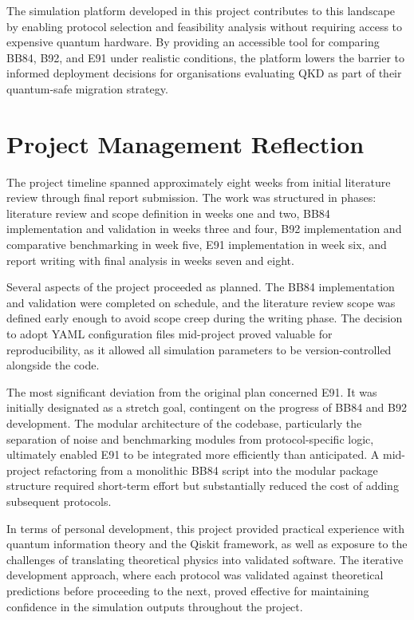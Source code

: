 \documentclass[10pt, a4paper]{report}
\begin{document}
The simulation platform developed in this project contributes to this landscape by enabling protocol selection and feasibility analysis without requiring access to expensive quantum hardware. By providing an accessible tool for comparing BB84, B92, and E91 under realistic conditions, the platform lowers the barrier to informed deployment decisions for organisations evaluating QKD as part of their quantum-safe migration strategy.



\section{Project Management Reflection}

The project timeline spanned approximately eight weeks from initial literature review through final report submission. The work was structured in phases: literature review and scope definition in weeks one and two, BB84 implementation and validation in weeks three and four, B92 implementation and comparative benchmarking in week five, E91 implementation in week six, and report writing with final analysis in weeks seven and eight.

Several aspects of the project proceeded as planned. The BB84 implementation and validation were completed on schedule, and the literature review scope was defined early enough to avoid scope creep during the writing phase. The decision to adopt YAML configuration files mid-project proved valuable for reproducibility, as it allowed all simulation parameters to be version-controlled alongside the code.

The most significant deviation from the original plan concerned E91. It was initially designated as a stretch goal, contingent on the progress of BB84 and B92 development. The modular architecture of the codebase, particularly the separation of noise and benchmarking modules from protocol-specific logic, ultimately enabled E91 to be integrated more efficiently than anticipated. A mid-project refactoring from a monolithic BB84 script into the modular package structure required short-term effort but substantially reduced the cost of adding subsequent protocols.

In terms of personal development, this project provided practical experience with quantum information theory and the Qiskit framework, as well as exposure to the challenges of translating theoretical physics into validated software. The iterative development approach, where each protocol was validated against theoretical predictions before proceeding to the next, proved effective for maintaining confidence in the simulation outputs throughout the project.
\end{document}
